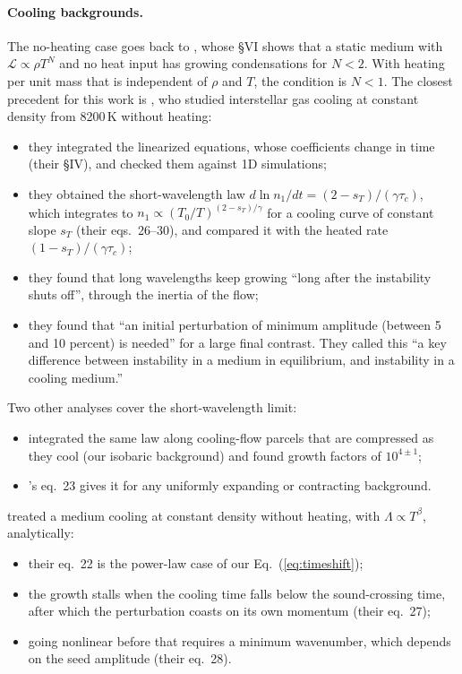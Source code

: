 \documentclass[11pt]{article}
\begin{document}
\paragraph{Cooling backgrounds.} The no-heating case goes back to \citet{field65},
whose \S VI shows that a static medium with $\mathcal{L}\propto\rho T^N$ and no heat
input has growing condensations for $N<2$. With heating per unit mass that is
independent of $\rho$ and $T$, the condition is $N<1$. The closest precedent for this
work is \citet{schwarz72}, who studied interstellar gas cooling at constant density
from 8200\,K without heating:
\begin{itemize}
\item they integrated the linearized equations, whose coefficients change in time
  (their \S IV), and checked them against 1D simulations;
\item they obtained the short-wavelength law $d\ln n_1/dt=(2-s_T)/(\gamma\tau_c)$, which
  integrates to $n_1\propto(T_0/T)^{(2-s_T)/\gamma}$ for a cooling curve of constant
  slope $s_T$ (their eqs.~26--30), and compared it with the heated rate
  $(1-s_T)/(\gamma\tau_c)$;
\item they found that long wavelengths keep growing ``long after the instability
  shuts off'', through the inertia of the flow;
\item they found that ``an initial perturbation of minimum amplitude (between 5 and 10
  percent) is needed'' for a large final contrast. They called this ``a key
  difference between instability in a medium in equilibrium, and instability in a
  cooling medium.''
\end{itemize}
Two other analyses cover the short-wavelength limit:
\begin{itemize}
\item \citet{mathews78} integrated the same law along cooling-flow parcels that are
  compressed as they cool (our isobaric background) and found growth factors of
  $10^{4\pm1}$;
\item \citet{balbus86}'s eq.~23 gives it for any uniformly expanding or contracting
  background.
\end{itemize}
\citet{burkert00} treated a medium cooling at constant density without heating, with
$\Lambda\propto T^\beta$, analytically:
\begin{itemize}
\item their eq.~22 is the power-law case of our Eq.~(\ref{eq:timeshift});
\item the growth stalls when the cooling time falls below the sound-crossing time,
  after which the perturbation coasts on its own momentum (their eq.~27);
\item going nonlinear before that requires a minimum wavenumber, which depends on the
  seed amplitude (their eq.~28).
\end{itemize}
\end{document}
